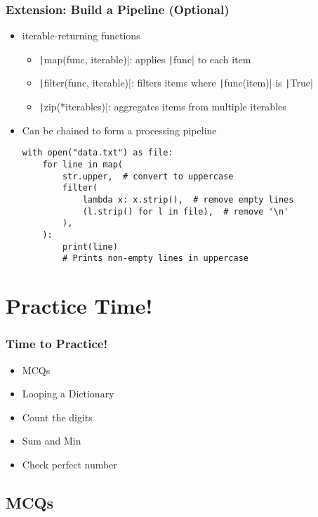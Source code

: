 \documentclass{beamer}
\begin{document}
\begin{frame}[fragile]
    \frametitle{Extension: Build a Pipeline (Optional)}
    \begin{itemize}
        \item iterable-returning functions
              \begin{itemize}
                  \item \texttt|map(func, iterable)|: applies \texttt|func| to each item
                  \item \texttt|filter(func, iterable)|: filters items where \texttt|func(item)| is \texttt|True|
                  \item \texttt|zip(*iterables)|: aggregates items from multiple iterables
              \end{itemize}
        \item Can be chained to form a processing pipeline
              \begin{verbatim}
with open("data.txt") as file:
    for line in map(
        str.upper,  # convert to uppercase
        filter(
            lambda x: x.strip(),  # remove empty lines
            (l.strip() for l in file),  # remove '\n'
        ),
    ):
        print(line)
        # Prints non-empty lines in uppercase

              \end{verbatim}
    \end{itemize}
\end{frame}


\section{Practice Time!}

\begin{frame}
    \frametitle{Time to Practice!}
    \begin{itemize}
        \item MCQs
        \item Looping a Dictionary
        \item Count the digits
        \item Sum and Min
        \item Check perfect number
    \end{itemize}
\end{frame}


\subsection{MCQs}
\end{document}
